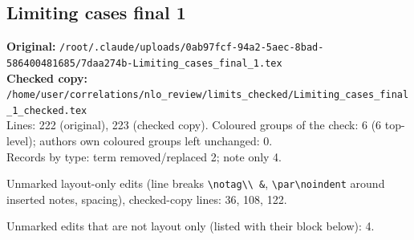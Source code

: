 \documentclass[10pt]{article}
\begin{document}
\subsection{Limiting cases final 1}\label{sec:file-limiting_final_1}
\noindent\textbf{Original:} \texttt{/root/.claude/uploads/0ab97fcf-94a2-5aec-8bad-586400481685/7daa274b-Limiting\_cases\_final\_1.tex}\\\textbf{Checked copy:} \texttt{/home/user/correlations/nlo\_review/limits\_checked/Limiting\_cases\_final\_1\_checked.tex}\\
Lines: 222 (original), 223 (checked copy). Coloured groups of the check: 6 (6 top-level); author\textquotesingle s own coloured groups left unchanged: 0.\\
Records by type: term removed/replaced 2; note only 4.
\par\noindent Unmarked layout-only edits (line breaks \texttt{\textbackslash notag\textbackslash\textbackslash\ \&}, \texttt{\textbackslash par\textbackslash noindent} around inserted notes, spacing), checked-copy lines: 36, 108, 122.
\par\noindent Unmarked edits that are not layout only (listed with their block below): 4.
\end{document}

